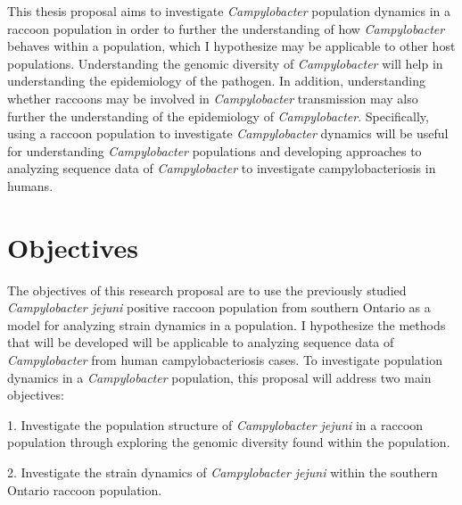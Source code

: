 \documentclass[letterpaper,titlepage,12pt]{article}
\begin{document}
This thesis proposal aims to investigate \textit{Campylobacter} population dynamics in a raccoon population in order to further the understanding of how \textit{Campylobacter} behaves within a population, which I hypothesize may be applicable to other host populations.
Understanding the genomic diversity of \textit{Campylobacter} will help in understanding the epidemiology of the pathogen. In addition, understanding whether raccoons may be involved in \textit{Campylobacter} transmission may also further the understanding of the epidemiology of \textit{Campylobacter}. Specifically, using a raccoon population to investigate \textit{Campylobacter} dynamics will be useful for understanding \textit{Campylobacter} populations and developing approaches to analyzing sequence data of \textit{Campylobacter} to investigate campylobacteriosis in humans. 



\section{Objectives}

The objectives of this research proposal are to use the previously studied \textit{Campylobacter jejuni} positive raccoon population from southern Ontario as a model for analyzing strain dynamics in a population. I hypothesize the methods that will be developed will be applicable to analyzing sequence data of \textit{Campylobacter} from human campylobacteriosis cases. To investigate population dynamics in a \textit{Campylobacter} population, this proposal will address two main objectives: 

1. Investigate the population structure of \textit{Campylobacter jejuni} in a raccoon population through exploring the genomic diversity found within the population. 

2. Investigate the strain dynamics of \textit{Campylobacter jejuni} within the southern Ontario raccoon population. 
\end{document}
